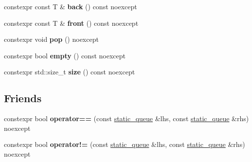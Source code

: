\begin{DoxyCompactItemize}
constexpr const T \& {\bfseries back} () const noexcept
\item 
\mbox{\label{classsequoia_1_1data__structures_1_1static__queue_a0b3d373a54c8ea1a731c18a3fb4dcf0f}} 
constexpr const T \& {\bfseries front} () const noexcept
\item 
\mbox{\label{classsequoia_1_1data__structures_1_1static__queue_a068a2fef79229546a3100eae9cff65ce}} 
constexpr void {\bfseries pop} () noexcept
\item 
\mbox{\label{classsequoia_1_1data__structures_1_1static__queue_a2b2e657afa617b291837dbfabc837c14}} 
constexpr bool {\bfseries empty} () const noexcept
\item 
\mbox{\label{classsequoia_1_1data__structures_1_1static__queue_a8fe7ccbd3aa00abec86f4e472b32296b}} 
constexpr std\+::size\+\_\+t {\bfseries size} () const noexcept
\end{DoxyCompactItemize}
\subsection*{Friends}
\begin{DoxyCompactItemize}
\item 
\mbox{\label{classsequoia_1_1data__structures_1_1static__queue_a41558b8ad38b6fae4bd9653bde941c83}} 
constexpr bool {\bfseries operator==} (const \mbox{\hyperlink{classsequoia_1_1data__structures_1_1static__queue}{static\+\_\+queue}} \&lhs, const \mbox{\hyperlink{classsequoia_1_1data__structures_1_1static__queue}{static\+\_\+queue}} \&rhs) noexcept
\item 
\mbox{\label{classsequoia_1_1data__structures_1_1static__queue_a5f4fc0d38e92bd87f08b15ff0e35cf40}} 
constexpr bool {\bfseries operator!=} (const \mbox{\hyperlink{classsequoia_1_1data__structures_1_1static__queue}{static\+\_\+queue}} \&lhs, const \mbox{\hyperlink{classsequoia_1_1data__structures_1_1static__queue}{static\+\_\+queue}} \&rhs) noexcept
\end{DoxyCompactItemize}


